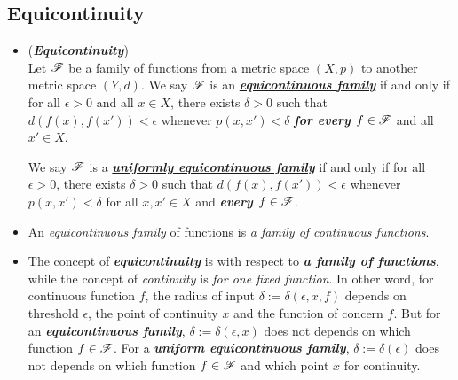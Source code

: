 \documentclass[11pt]{article}
\begin{document}
\subsection{Equicontinuity}
\begin{itemize}
\item \begin{definition}  (\emph{\textbf{Equicontinuity}}) \citep{reed1980methods} \\
Let ${\mathscr F}$ be a family of functions from a metric space $(X, p)$ to another metric space $(Y, d)$. We say ${\mathscr F}$ is an \underline{\emph{\textbf{equicontinuous family}}} if and only if for all $\epsilon >0$ and all $x \in X$, there exists $\delta > 0$ such that $d(f(x), f(x')) < \epsilon$ whenever $p(x, x') < \delta$ \emph{\textbf{for every $f \in {\mathscr F}$}} and all $x' \in X$.

We say ${\mathscr F}$ is a \underline{\emph{\textbf{uniformly equicontinuous family}}} if and only if for all $\epsilon >0$, there exists $\delta > 0$ such that $d(f(x), f(x')) < \epsilon$ whenever $p(x, x') < \delta$ for all $x, x' \in X$ and \emph{\textbf{every $f \in {\mathscr F}$}}.
\end{definition}

\item \begin{remark}
An \emph{equicontinuous family} of functions is \emph{a family of continuous functions}.
\end{remark}

\item \begin{remark}
The concept of \emph{\textbf{equicontinuity}} is with respect to \emph{\textbf{a family of functions}}, while the concept of \emph{continuity} is \emph{for one fixed function}. In other word, for continuous function $f$, the radius of input $\delta := \delta(\epsilon, x, f)$ depends on threshold $\epsilon$, the point of continuity $x$ and the function of concern $f$. But for an \emph{\textbf{equicontinuous family}}, $\delta := \delta(\epsilon, x)$ does not depends on which function $f \in {\mathscr F}$. For a \emph{\textbf{uniform equicontinuous family}}, $\delta := \delta(\epsilon)$ does not depends on which function $f \in {\mathscr F}$ and which point $x$ for continuity.
\end{remark}


\end{itemize}
\end{document}

